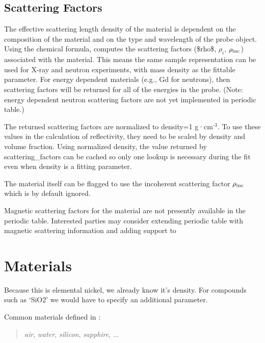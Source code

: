 \documentclass[letterpaper,10pt,english]{sphinxmanual}
\begin{document}
\subsection{Scattering Factors}
\label{guide/data:scattering-factors}\label{guide/data:data-scattering-factors}
The effective scattering length density of the material is dependent
on the composition of the material and on the type and wavelength of
the probe object.  Using the chemical formula,
{\hyperref[api/probe:refl1d.probe.Probe.scattering_factors]{}}
computes the scattering factors (\$rho\$, $\rho_i$, $\rho_{\rm inc}$)
associated with the material.  This means the same sample representation
can be used for X-ray and neutron experiments, with mass density as the
fittable parameter.  For energy dependent materials (e.g., Gd for neutrons),
then scattering factors will be returned for all of the energies in the
probe. (Note: energy dependent neutron scattering factors are not yet
implemented in periodic table.)

The returned scattering factors are normalized to density=1 g·cm$^{\text{-3}}$.
To use these values in the calculation of reflectivity, they need to
be scaled by density and volume fraction.  Using normalized density,
the value returned by scattering\_factors can be cached so only one
lookup is necessary during the fit even when density is a fitting
parameter.

The material itself can be flagged to use the incoherent scattering
factor $\rho_{\rm inc}$ which is by default ignored.

Magnetic scattering factors for the material are not presently
available in the periodic table.  Interested parties may consider
extending periodic table with magnetic scattering information and
adding support to
{\hyperref[api/probe:refl1d.probe.PolarizedNeutronProbe]{}}


\section{Materials}
\label{guide/materials:materials-guide}\label{guide/materials:materials}\label{guide/materials::doc}
Because this
is elemental nickel, we already know it's density.  For compounds
such as `SiO2' we would have to specify an additional
 parameter.

Common materials defined in {\hyperref[api/materialdb:module-refl1d.materialdb]{}}:
\begin{quote}

\emph{air}, \emph{water}, \emph{silicon}, \emph{sapphire}, ...
\end{quote}
\end{document}
